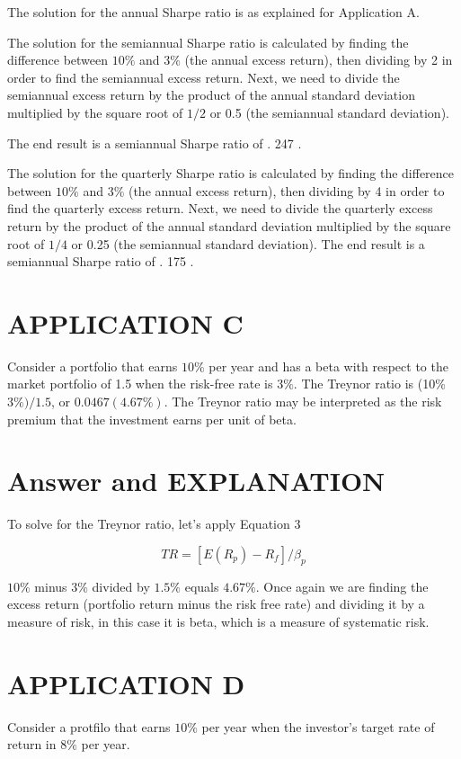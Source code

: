 \documentclass[11pt]{article}
\begin{document}
The solution for the annual Sharpe ratio is as explained for Application A.

The solution for the semiannual Sharpe ratio is calculated by finding the difference between $10 \%$ and $3 \%$ (the annual excess return), then dividing by 2 in order to find the semiannual excess return. Next, we need to divide the semiannual excess return by the product of the annual standard deviation multiplied by the square root of $1 / 2$ or 0.5 (the semiannual standard deviation).

The end result is a semiannual Sharpe ratio of . 247 .

The solution for the quarterly Sharpe ratio is calculated by finding the difference between $10 \%$ and $3 \%$ (the annual excess return), then dividing by 4 in order to find the quarterly excess return. Next, we need to divide the quarterly excess return by the product of the annual standard deviation multiplied by the square root of $1 / 4$ or 0.25 (the semiannual standard deviation). The end result is a semiannual Sharpe ratio of . 175 .

\section*{APPLICATION C}
Consider a portfolio that earns $10 \%$ per year and has a beta with respect to the market portfolio of 1.5 when the risk-free rate is $3 \%$. The Treynor ratio is (10\%$3 \%) / 1.5$, or $0.0467(4.67 \%)$. The Treynor ratio may be interpreted as the risk premium that the investment earns per unit of beta.

\section*{Answer and EXPLANATION}
To solve for the Treynor ratio, let's apply Equation 3

$$
T R=\left[E\left(R_{p}\right)-R_{f}\right] / \beta_{p}
$$

$10 \%$ minus $3 \%$ divided by $1.5 \%$ equals $4.67 \%$. Once again we are finding the excess return (portfolio return minus the risk free rate) and dividing it by a measure of risk, in this case it is beta, which is a measure of systematic risk.

\section*{APPLICATION D}
Consider a protfilo that earns $10 \%$ per year when the investor's target rate of return in $8 \%$ per year.
\end{document}
